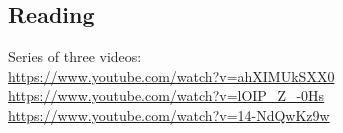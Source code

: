 



\subsection*{Reading}
\begin{center}
\begin{tcolorbox}[width=0.8\textwidth,colback={white},title={\textbf{Go and watch...}},colbacktitle=black,coltitle=white]
  Series of three videos:\\
  \textcolor{black}{\url{https://www.youtube.com/watch?v=ahXIMUkSXX0}}\\
  \textcolor{black}{\url{https://www.youtube.com/watch?v=lOIP_Z_-0Hs}}\\
  \textcolor{black}{\url{https://www.youtube.com/watch?v=14-NdQwKz9w}}
\end{tcolorbox}
\end{center}

